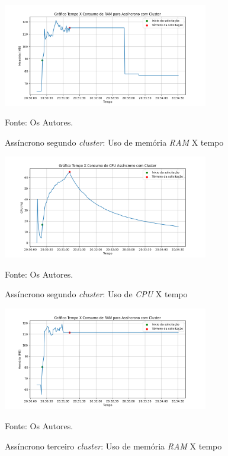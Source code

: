 \documentclass[12pt]{article}
\begin{document}
\begin{figure}[!h]
\centering
\caption{Assíncrono segundo \textit{cluster}: Uso de memória \textit{RAM} X tempo}
\includegraphics[width=0.8\textwidth]{images/pt-br/results/async-cluster_memory_usage_1.png}
\label{fig:async-cluster_memory_usage_1}

Fonte: Os Autores.
\end{figure}

\begin{figure}[!h]
\centering
\caption{Assíncrono segundo \textit{cluster}: Uso de \textit{CPU} X tempo}
\includegraphics[width=0.8\textwidth]{images/pt-br/results/async-cluster_cpu_usage_1.png}
\label{fig:async-cluster_cpu_usage_1}

Fonte: Os Autores.
\end{figure}


\begin{figure}[!h]
\centering
\caption{Assíncrono terceiro \textit{cluster}: Uso de memória \textit{RAM} X tempo}
\includegraphics[width=0.8\textwidth]{images/pt-br/results/async-cluster_memory_usage_2.png}
\label{fig:async-cluster_memory_usage_2}

Fonte: Os Autores.
\end{figure}
\end{document}
